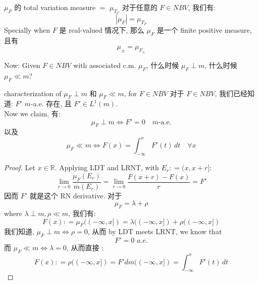 \documentclass[lang=cn,11pt]{elegantbook}
\begin{document}
\begin{theorem}{$\mu_F$ 的 total variation measure $=$ $\mu_{T_F}$}
    对于任意的 $F \in NBV$, 我们有: \[|\mu_F| = \mu_{T_F} \] Specially when $F$ 是 real-valued 情况下, 那么 $\mu_F$ 是一个 finite positive measure, 且有 \[\mu_{\pm} = \mu_{F_{\pm}}\]
\end{theorem}



Now: Given $F\in NBV$ with associated c.m. $\mu_F$, 什么时候 $\mu_F \perp m$, 什么时候 $\mu_F \ll m$?

\begin{theorem}{characterization of $\mu_F \perp m$ 和 $\mu_F \ll m$, for $F\in NBV$ }
    对于 $F \in NBV$, 我们已经知道: $F'$ $m$-a.e. 存在, 且 $F'\in L^1(m)$.\\
    Now we claim, 有: \[
    \mu_F \perp m \iff F' = 0 \quad m\text{-a.e.}
    \]以及 \[
        \mu_F \ll m \iff F(x) = \int_{-\infty}^x F'(t)\,d t \quad \forall x
    \]
\end{theorem}
\begin{proof}
Let $x\in \mathbb{R}$.  Applying LDT and LRNT, with $E_r: = (x,x+r]$: \[
    \lim_{r\to 0} \frac{\mu_F(E_r)}{m(E_r)} = \lim_{r\to 0} \frac{F(x+r)- F(x)}{r} = F'
    \]
    因而 $F'$ 就是这个 RN derivative. 对于 \[
    \mu_F = \lambda + \rho
    \]
    where $\lambda \perp m, \rho \ll m$, 我们有: \[F(x) : = \mu_F((-\infty,x]) =\lambda ((-\infty,x]) +\rho ((-\infty,x]) \]
我们知道, $    \mu_F \perp m \iff \rho = 0$, 从而 by LDT meets LRNT, we know that \[
F' = 0 \,\, a.e.
\]
而   $    \mu_F \ll m \iff \lambda = 0$, 从而直接 : \[F(x) : = \rho ((-\infty,x]) = F'dm((-\infty,x]) =   \int_{-\infty}^x F'(t)\,d t \]
\end{proof}
\end{document}

